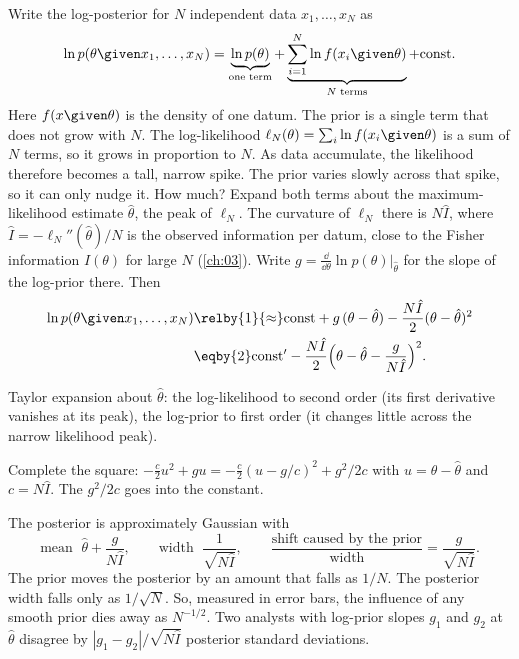 Write the log-posterior for $N$ independent data $x_1,\dots,x_N$ as
\begin{equation}
  \ln p(\theta\given x_1,\dots,x_N)
  =\underbrace{\ln p(\theta)}_{\text{one term}}
   +\underbrace{\sum_{i=1}^N\ln f(x_i\given\theta)}_{N\text{ terms}}
   +\text{const}.
  \label{5b:eq:logpost-N}
\end{equation}
Here $f(x\given\theta)$ is the density of one datum. The prior is a single term that
does not grow with $N$. The log-likelihood $\ell_N(\theta)=\sum_i\ln f(x_i\given\theta)$
is a sum of $N$ terms, so it grows in proportion to $N$. As data accumulate, the
likelihood therefore becomes a tall, narrow spike. The prior varies slowly across that
spike, so it can only nudge it. How much? Expand both terms about the
maximum-likelihood estimate $\hat\theta$, the peak of $\ell_N$. The curvature of $\ell_N$
there is $N\hat I$, where $\hat I=-\ell_N''(\hat\theta)/N$ is the observed information per
datum, close to the Fisher information $I(\theta)$ for large $N$ (\cref{ch:03}). Write
$g=\frac{\dd}{\dd\theta}\ln p(\theta)\big|_{\hat\theta}$ for the slope of the log-prior
there. Then
\begin{align}
  \ln p(\theta\given x_1,\dots,x_N)
  &\relby{1}{\approx}\text{const}+g\,(\theta-\hat\theta)
      -\frac{N\hat I}{2}(\theta-\hat\theta)^2
   \nonumber\\
  &\eqby{2}\text{const}'-\frac{N\hat I}{2}
      \Bigl(\theta-\hat\theta-\frac{g}{N\hat I}\Bigr)^2 .
  \label{5b:eq:bvm-shift}
\end{align}
\begin{explain}
  \item Taylor expansion about $\hat\theta$: the log-likelihood to second order (its
        first derivative vanishes at its peak), the log-prior to first order (it changes
        little across the narrow likelihood peak).
  \item Complete the square: $-\frac{c}{2}u^2+gu=-\frac c2(u-g/c)^2+g^2/2c$ with
        $u=\theta-\hat\theta$ and $c=N\hat I$. The $g^2/2c$ goes into the constant.
\end{explain}
The posterior is approximately Gaussian with
\begin{equation}
  \text{mean }\;\hat\theta+\frac{g}{N\hat I},\qquad
  \text{width }\;\frac{1}{\sqrt{N\hat I}},\qquad
  \frac{\text{shift caused by the prior}}{\text{width}}=\frac{g}{\sqrt{N\hat I}} .
  \label{5b:eq:bvm-ratio}
\end{equation}
The prior moves the posterior by an amount that falls as $1/N$. The posterior width
falls only as $1/\sqrt N$. So, measured in error bars, the influence of any smooth prior
dies away as $N^{-1/2}$. Two analysts with log-prior slopes $g_1$ and $g_2$ at
$\hat\theta$ disagree by $|g_1-g_2|/\sqrt{N\hat I}$ posterior standard deviations.

